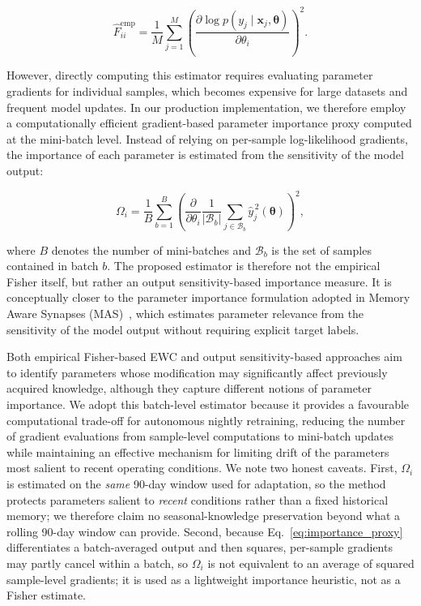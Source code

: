 \documentclass[journal]{IEEEtran}
\begin{document}
\begin{equation}
    \hat{F}_{ii}^{\mathrm{emp}}
    =
    \frac{1}{M}
    \sum_{j=1}^{M}
    \left(
    \frac{\partial
    \log p(y_j \mid \mathbf{x}_j,\boldsymbol{\theta})}
    {\partial \theta_i}
    \right)^2 .
    \label{eq:empirical_fisher}
\end{equation}

However, directly computing this estimator requires evaluating
parameter gradients for individual samples, which becomes expensive for
large datasets and frequent model updates. In our production
implementation, we therefore employ a computationally efficient
gradient-based parameter importance proxy computed at the mini-batch
level. Instead of relying on per-sample log-likelihood gradients, the
importance of each parameter is estimated from the sensitivity of the
model output:

\begin{equation}
    \Omega_i
    =
    \frac{1}{B}
    \sum_{b=1}^{B}
    \left(
    \frac{\partial}{\partial \theta_i}
    \frac{1}{|\mathcal{B}_b|}
    \sum_{j\in\mathcal{B}_b}
    \hat{y}_{j}^{\,2}(\boldsymbol{\theta})
    \right)^2 ,
    \label{eq:importance_proxy}
\end{equation}

where $B$ denotes the number of mini-batches and $\mathcal{B}_b$ is the
set of samples contained in batch $b$. The proposed estimator is
therefore not the empirical Fisher itself, but rather an output
sensitivity-based importance measure. It is conceptually closer to the
parameter importance formulation adopted in Memory Aware Synapses
(MAS)~\cite{aljundi2018memory}, which estimates parameter relevance from
the sensitivity of the model output without requiring explicit target
labels.

Both empirical Fisher-based EWC and output sensitivity-based approaches
aim to identify parameters whose modification may significantly affect
previously acquired knowledge, although they capture different notions
of parameter importance. We adopt this batch-level estimator because it
provides a favourable computational trade-off for autonomous nightly
retraining, reducing the number of gradient evaluations from
sample-level computations to mini-batch updates while maintaining an
effective mechanism for limiting drift of the parameters most salient to
recent operating conditions. We note two honest caveats. First,
$\Omega_i$ is estimated on the \emph{same} 90-day window used for
adaptation, so the method protects parameters salient to \emph{recent}
conditions rather than a fixed historical memory; we therefore claim no
seasonal-knowledge preservation beyond what a rolling 90-day window can
provide. Second, because Eq.~\eqref{eq:importance_proxy} differentiates a
batch-averaged output and then squares, per-sample gradients may partly
cancel within a batch, so $\Omega_i$ is not equivalent to an average of
squared sample-level gradients; it is used as a lightweight importance
heuristic, not as a Fisher estimate.
\end{document}
